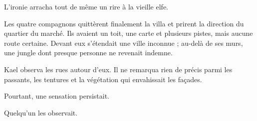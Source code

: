 L'ironie arracha tout de même un rire à la vieille elfe.

\scenebreak

Les quatre compagnons quittèrent finalement la villa et prirent la direction du quartier du marché. Ils avaient un toit, une carte et plusieurs pistes, mais aucune route certaine. Devant eux s'étendait une ville inconnue ; au-delà de ses murs, une jungle dont presque personne ne revenait indemne.

Kael observa les rues autour d'eux. Il ne remarqua rien de précis parmi les passants, les tentures et la végétation qui envahissait les façades.

Pourtant, une sensation persistait.

Quelqu'un les observait.
